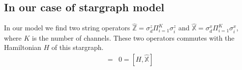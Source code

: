 \documentclass[reprint,prb,superscriptaddress]{revtex4-1}
\begin{document}
%
%
%
%

\subsection{In our case of stargraph model}
\noindent In our model we find two string operators $\hat{\mathbb{Z}}=\sigma_d^z\Pi_{i=1}^{K} \sigma_i^z$ and $\hat{\mathbb{X}}=\sigma_d^x\Pi_{i=1}^{K} \sigma_i^x$, where $K$ is the number of channels. These two operators commutes with the Hamiltonian $H$ of this stargraph.
\begin{eqnarray}
[H,\hat{\mathbb{Z}}] &=& 0 = [H,\hat{\mathbb{X}}]
\end{eqnarray}
\end{document}
